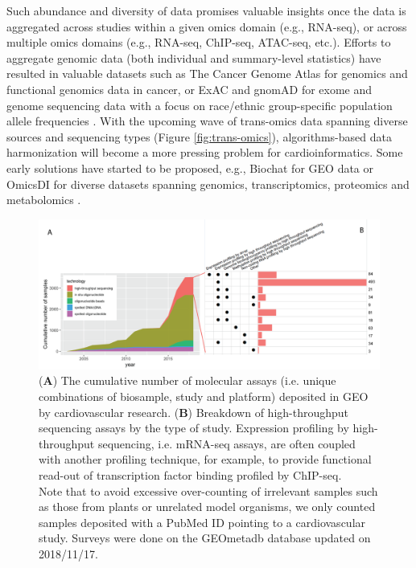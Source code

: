 \documentclass[letter]{bioinfo}
\begin{document}
	Such abundance and diversity of data promises valuable insights once the data is aggregated across studies within a given omics domain (e.g., RNA-seq), or across multiple omics domains (e.g., RNA-seq, ChIP-seq, ATAC-seq, etc.). Efforts to aggregate genomic data (both individual and summary-level statistics) have resulted in valuable datasets such as The Cancer Genome Atlas \citep{TCGA:2013:Cancer} for genomics and functional genomics data in cancer, or ExAC and gnomAD for exome and genome sequencing data with a focus on race/ethnic group-specific population allele frequencies \citep{Lek:2016:Analysis}. With the upcoming wave of trans-omics data spanning diverse sources and sequencing types (Figure \ref{fig:trans-omics}), algorithms-based data harmonization will become a more pressing problem for cardioinformatics. Some early solutions have started to be proposed, e.g., Biochat for GEO data \citep{Khomtchouk:2018:Biochat} or OmicsDI for diverse datasets spanning genomics, transcriptomics, proteomics and metabolomics \citep{Perez-Riverol:2017:Discovering}.
	
	\begin{figure}[!tpb]
		\includegraphics[width=1\linewidth]{assay-count-cardio}
		\caption{(\textbf{A}) The cumulative number of molecular assays (i.e. unique combinations of biosample, study and platform) deposited in GEO by cardiovascular research. (\textbf{B}) Breakdown of high-throughput sequencing assays by the type of study. Expression profiling by high-throughput sequencing, i.e. mRNA-seq assays, are often coupled with another profiling technique, for example, to provide functional read-out of transcription factor binding profiled by ChIP-seq. \label{fig:geo-assay}\\ Note that to avoid excessive over-counting of irrelevant samples such as those from plants or unrelated model organisms, we only counted samples deposited with a PubMed ID pointing to a cardiovascular study. Surveys were done on the GEOmetadb database \citep{Zhu:2008:GEOmetadb} updated on 2018/11/17.}
	\end{figure} 
	
\end{document}
